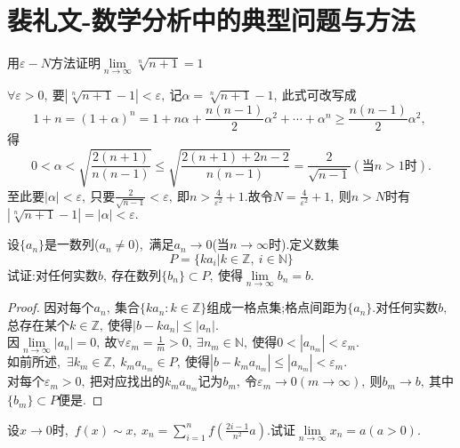 \section{裴礼文-数学分析中的典型问题与方法}
\begin{problem}
	用$\varepsilon-N$方法证明$\lim\limits_{n\rightarrow\infty}\sqrt[n]{n+1}=1$
\end{problem}
\begin{solution}
	$\forall\varepsilon>0,\ $要$|\sqrt[n]{n+1}-1|<\varepsilon,\ $记$\alpha=\sqrt[n]{n+1}-1,\ $此式可改写成
	$$1+n=(1+\alpha)^n=1+n\alpha+\frac{n(n-1)}{2}\alpha^2+\cdots+\alpha^n\geqslant\frac{n(n-1)}{2}\alpha^2,\ $$
	得
	$$0<\alpha<\sqrt{\frac{2(n+1)}{n(n-1)}}\leqslant\sqrt{\frac{2(n+1)+2n-2}{n(n-1)}}=\frac{2}{\sqrt{n-1}}(\text{当}n>1\text{时}).$$
	至此要$|\alpha|<\varepsilon,\ $只要$\frac{2}{\sqrt{n-1}}<\varepsilon,\ $即$n>\frac{4}{\varepsilon^2}+1.$故令$N=\frac{4}{\varepsilon^2}+1,\ $则$n>N$时有$|\sqrt[n]{n+1}-1|=|\alpha|<\varepsilon.$
\end{solution}
\begin{problem}
	设$\{a_n\}$是一数列($a_n\neq 0$),\ 满足$a_n\rightarrow 0$(当$n\rightarrow\infty$时).定义数集
	$$P=\{ka_i|k\in\mathbb{Z},\ i\in\mathbb{N}\}$$
	试证:对任何实数$b,\ $存在数列$\{b_n\}\subset P,\ $使得$\lim\limits_{n\rightarrow\infty}b_n=b.$
\end{problem}
\begin{proof}
	因对每个$a_n,\ $集合$\{ka_n:k\in\mathbb{Z}\}$组成一格点集;格点间距为$\{a_n\}.$对任何实数$b,\ $总存在某个$k\in\mathbb{Z},\ $使得$|b-ka_n|\leqslant|a_n|.$\\
	因$\lim\limits_{n\rightarrow\infty}|a_n|=0,\ $故$\forall\varepsilon_m=\frac{1}{m}>0,\ \exists n_m\in\mathbb{N},\ $使得$0<|a_{n_m}|<\varepsilon_m.$\\
	如前所述,\ $\exists k_m\in\mathbb{Z},\ k_ma_{n_m}\in P,\ $使得$|b-k_ma_{n_m}|\leqslant|a_{n_m}|<\varepsilon_m.$\\
	对每个$\varepsilon_m>0,\ $把对应找出的$k_ma_{n_m}$记为$b_m,\ $令$\varepsilon_m\rightarrow 0(m\rightarrow\infty),\ $则$b_m\rightarrow b,\ $其中$\{b_m\}\subset P$便是.
\end{proof}
\newpage
\begin{problem}
	设$x\rightarrow 0$时,\ $f(x)\sim x,\ x_n=\sum\limits_{i=1}^{n}f\left(\frac{2i-1}{n^2}a\right).$试证$\lim\limits_{n\rightarrow\infty}x_n=a(a>0).$
\end{problem}

